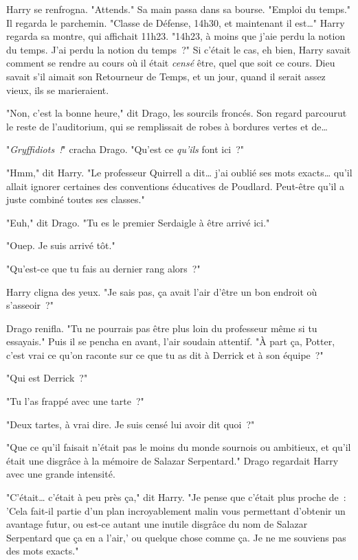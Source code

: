 Harry se renfrogna. "Attends." Sa main passa dans sa bourse. "Emploi du temps." Il regarda le parchemin. "Classe de Défense, 14h30, et maintenant il est…" Harry regarda sa montre, qui affichait 11h23. "14h23, à moins que j'aie perdu la notion du temps. J'ai perdu la notion du temps~?" Si c'était le cas, eh bien, Harry savait comment se rendre au cours où il était \emph{censé} être, quel que soit ce cours. Dieu savait s'il aimait son Retourneur de Temps, et un jour, quand il serait assez vieux, ils se marieraient.

"Non, c'est la bonne heure," dit Drago, les sourcils froncés. Son regard parcourut le reste de l'auditorium, qui se remplissait de robes à bordures vertes et de…

"\emph{Gryffidiots~!}" cracha Drago. "Qu'est ce \emph{qu'ils} font ici~?"

"Hmm," dit Harry. "Le professeur Quirrell a dit… j'ai oublié ses mots exacts… qu'il allait ignorer certaines des conventions éducatives de Poudlard. Peut-être qu'il a juste combiné toutes ses classes."

"Euh," dit Drago. "Tu es le premier Serdaigle à être arrivé ici."

"Ouep. Je suis arrivé tôt."

"Qu'est-ce que tu fais au dernier rang alors~?"

Harry cligna des yeux. "Je sais pas, ça avait l'air d'être un bon endroit où s'asseoir~?"

Drago renifla. "Tu ne pourrais pas être plus loin du professeur même si tu essayais." Puis il se pencha en avant, l'air soudain attentif. "À part ça, Potter, c'est vrai ce qu'on raconte sur ce que tu as dit à Derrick et à son équipe~?"

"Qui est Derrick~?"

"Tu l'as frappé avec une tarte~?"

"Deux tartes, à vrai dire. Je suis censé lui avoir dit quoi~?"

"Que ce qu'il faisait n'était pas le moins du monde sournois ou ambitieux, et qu'il était une disgrâce à la mémoire de Salazar Serpentard." Drago regardait Harry avec une grande intensité.

"C'était… c'était à peu près ça," dit Harry. "Je pense que c'était plus proche de~: 'Cela fait-il partie d'un plan incroyablement malin vous permettant d'obtenir un avantage futur, ou est-ce autant une inutile disgrâce du nom de Salazar Serpentard que ça en a l'air,' ou quelque chose comme ça. Je ne me souviens pas des mots exacts."

